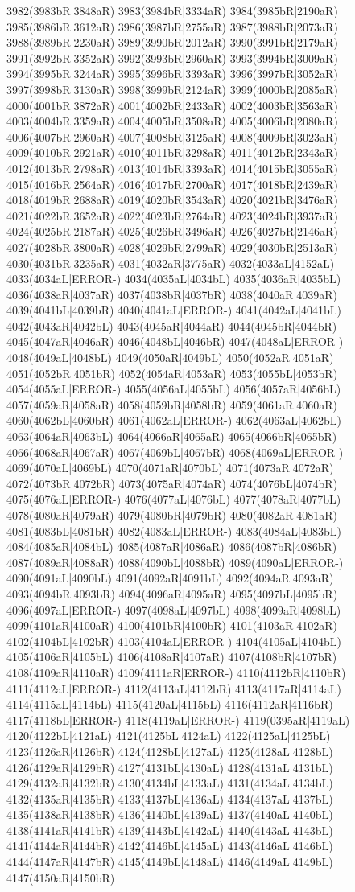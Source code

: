 3982(3983bR|3848aR) 3983(3984bR|3334aR) 3984(3985bR|2190aR) 3985(3986bR|3612aR) 3986(3987bR|2755aR) 3987(3988bR|2073aR) 3988(3989bR|2230aR) 3989(3990bR|2012aR) 3990(3991bR|2179aR) 3991(3992bR|3352aR) 3992(3993bR|2960aR) 3993(3994bR|3009aR) 3994(3995bR|3244aR) 3995(3996bR|3393aR) 3996(3997bR|3052aR) 3997(3998bR|3130aR) 3998(3999bR|2124aR) 3999(4000bR|2085aR) 4000(4001bR|3872aR) 4001(4002bR|2433aR) 4002(4003bR|3563aR) 4003(4004bR|3359aR) 4004(4005bR|3508aR) 4005(4006bR|2080aR) 4006(4007bR|2960aR) 4007(4008bR|3125aR) 4008(4009bR|3023aR) 4009(4010bR|2921aR) 4010(4011bR|3298aR) 4011(4012bR|2343aR) 4012(4013bR|2798aR) 4013(4014bR|3393aR) 4014(4015bR|3055aR) 4015(4016bR|2564aR) 4016(4017bR|2700aR) 4017(4018bR|2439aR) 4018(4019bR|2688aR) 4019(4020bR|3543aR) 4020(4021bR|3476aR) 4021(4022bR|3652aR) 4022(4023bR|2764aR) 4023(4024bR|3937aR) 4024(4025bR|2187aR) 4025(4026bR|3496aR) 4026(4027bR|2146aR) 4027(4028bR|3800aR) 4028(4029bR|2799aR) 4029(4030bR|2513aR) 4030(4031bR|3235aR) 4031(4032aR|3775aR) 4032(4033aL|4152aL) 4033(4034aL|ERROR-) 4034(4035aL|4034bL) 4035(4036aR|4035bL) 4036(4038aR|4037aR) 4037(4038bR|4037bR) 4038(4040aR|4039aR) 4039(4041bL|4039bR) 4040(4041aL|ERROR-) 4041(4042aL|4041bL) 4042(4043aR|4042bL) 4043(4045aR|4044aR) 4044(4045bR|4044bR) 4045(4047aR|4046aR) 4046(4048bL|4046bR) 4047(4048aL|ERROR-) 4048(4049aL|4048bL) 4049(4050aR|4049bL) 4050(4052aR|4051aR) 4051(4052bR|4051bR) 4052(4054aR|4053aR) 4053(4055bL|4053bR) 4054(4055aL|ERROR-) 4055(4056aL|4055bL) 4056(4057aR|4056bL) 4057(4059aR|4058aR) 4058(4059bR|4058bR) 4059(4061aR|4060aR) 4060(4062bL|4060bR) 4061(4062aL|ERROR-) 4062(4063aL|4062bL) 4063(4064aR|4063bL) 4064(4066aR|4065aR) 4065(4066bR|4065bR) 4066(4068aR|4067aR) 4067(4069bL|4067bR) 4068(4069aL|ERROR-) 4069(4070aL|4069bL) 4070(4071aR|4070bL) 4071(4073aR|4072aR) 4072(4073bR|4072bR) 4073(4075aR|4074aR) 4074(4076bL|4074bR) 4075(4076aL|ERROR-) 4076(4077aL|4076bL) 4077(4078aR|4077bL) 4078(4080aR|4079aR) 4079(4080bR|4079bR) 4080(4082aR|4081aR) 4081(4083bL|4081bR) 4082(4083aL|ERROR-) 4083(4084aL|4083bL) 4084(4085aR|4084bL) 4085(4087aR|4086aR) 4086(4087bR|4086bR) 4087(4089aR|4088aR) 4088(4090bL|4088bR) 4089(4090aL|ERROR-) 4090(4091aL|4090bL) 4091(4092aR|4091bL) 4092(4094aR|4093aR) 4093(4094bR|4093bR) 4094(4096aR|4095aR) 4095(4097bL|4095bR) 4096(4097aL|ERROR-) 4097(4098aL|4097bL) 4098(4099aR|4098bL) 4099(4101aR|4100aR) 4100(4101bR|4100bR) 4101(4103aR|4102aR) 4102(4104bL|4102bR) 4103(4104aL|ERROR-) 4104(4105aL|4104bL) 4105(4106aR|4105bL) 4106(4108aR|4107aR) 4107(4108bR|4107bR) 4108(4109aR|4110aR) 4109(4111aR|ERROR-) 4110(4112bR|4110bR) 4111(4112aL|ERROR-) 4112(4113aL|4112bR) 4113(4117aR|4114aL) 4114(4115aL|4114bL) 4115(4120aL|4115bL) 4116(4112aR|4116bR) 4117(4118bL|ERROR-) 4118(4119aL|ERROR-) 4119(0395aR|4119aL) 4120(4122bL|4121aL) 4121(4125bL|4124aL) 4122(4125aL|4125bL) 4123(4126aR|4126bR) 4124(4128bL|4127aL) 4125(4128aL|4128bL) 4126(4129aR|4129bR) 4127(4131bL|4130aL) 4128(4131aL|4131bL) 4129(4132aR|4132bR) 4130(4134bL|4133aL) 4131(4134aL|4134bL) 4132(4135aR|4135bR) 4133(4137bL|4136aL) 4134(4137aL|4137bL) 4135(4138aR|4138bR) 4136(4140bL|4139aL) 4137(4140aL|4140bL) 4138(4141aR|4141bR) 4139(4143bL|4142aL) 4140(4143aL|4143bL) 4141(4144aR|4144bR) 4142(4146bL|4145aL) 4143(4146aL|4146bL) 4144(4147aR|4147bR) 4145(4149bL|4148aL) 4146(4149aL|4149bL) 4147(4150aR|4150bR) 